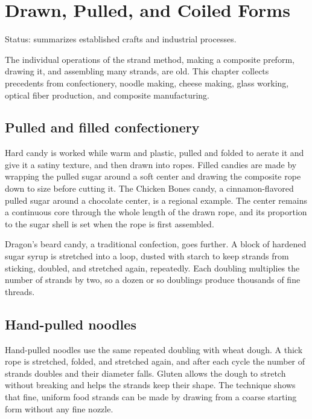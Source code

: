 \documentclass[11pt,openany]{book}
\theoremstyle{definition}
\begin{document}
\chapter{Drawn, Pulled, and Coiled Forms}\label{ch:drawn}

Status: summarizes established crafts and industrial processes.

The individual operations of the strand method, making a composite preform, drawing it, and assembling many strands, are old. This chapter collects precedents from confectionery, noodle making, cheese making, glass working, optical fiber production, and composite manufacturing.

\section{Pulled and filled confectionery}

Hard candy is worked while warm and plastic, pulled and folded to aerate it and give it a satiny texture, and then drawn into ropes. Filled candies are made by wrapping the pulled sugar around a soft center and drawing the composite rope down to size before cutting it. The Chicken Bones candy, a cinnamon-flavored pulled sugar around a chocolate center, is a regional example. The center remains a continuous core through the whole length of the drawn rope, and its proportion to the sugar shell is set when the rope is first assembled.

Dragon's beard candy, a traditional confection, goes further. A block of hardened sugar syrup is stretched into a loop, dusted with starch to keep strands from sticking, doubled, and stretched again, repeatedly. Each doubling multiplies the number of strands by two, so a dozen or so doublings produce thousands of fine threads.

\section{Hand-pulled noodles}

Hand-pulled noodles use the same repeated doubling with wheat dough. A thick rope is stretched, folded, and stretched again, and after each cycle the number of strands doubles and their diameter falls. Gluten allows the dough to stretch without breaking and helps the strands keep their shape. The technique shows that fine, uniform food strands can be made by drawing from a coarse starting form without any fine nozzle.
\end{document}
